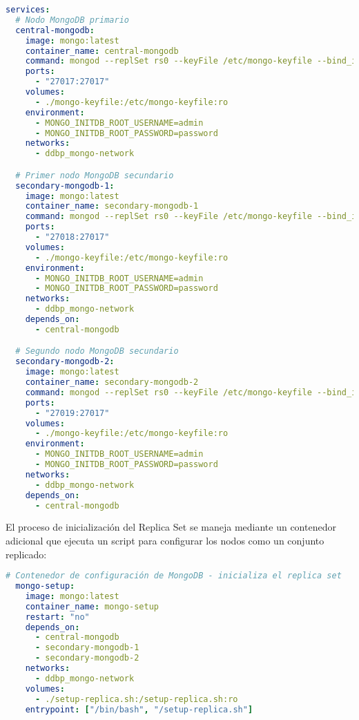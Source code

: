 \documentclass[12pt,letterpaper]{article}
\begin{document}
\begin{lstlisting}[language=yaml]
services:
  # Nodo MongoDB primario
  central-mongodb:
    image: mongo:latest
    container_name: central-mongodb
    command: mongod --replSet rs0 --keyFile /etc/mongo-keyfile --bind_ip_all --auth --port 27017
    ports:
      - "27017:27017"
    volumes:
      - ./mongo-keyfile:/etc/mongo-keyfile:ro
    environment:
      - MONGO_INITDB_ROOT_USERNAME=admin
      - MONGO_INITDB_ROOT_PASSWORD=password
    networks:
      - ddbp_mongo-network

  # Primer nodo MongoDB secundario
  secondary-mongodb-1:
    image: mongo:latest
    container_name: secondary-mongodb-1
    command: mongod --replSet rs0 --keyFile /etc/mongo-keyfile --bind_ip_all --auth --port 27017
    ports:
      - "27018:27017"
    volumes:
      - ./mongo-keyfile:/etc/mongo-keyfile:ro
    environment:
      - MONGO_INITDB_ROOT_USERNAME=admin
      - MONGO_INITDB_ROOT_PASSWORD=password
    networks:
      - ddbp_mongo-network
    depends_on:
      - central-mongodb

  # Segundo nodo MongoDB secundario
  secondary-mongodb-2:
    image: mongo:latest
    container_name: secondary-mongodb-2
    command: mongod --replSet rs0 --keyFile /etc/mongo-keyfile --bind_ip_all --auth --port 27017
    ports:
      - "27019:27017"
    volumes:
      - ./mongo-keyfile:/etc/mongo-keyfile:ro
    environment:
      - MONGO_INITDB_ROOT_USERNAME=admin
      - MONGO_INITDB_ROOT_PASSWORD=password
    networks:
      - ddbp_mongo-network
    depends_on:
      - central-mongodb
\end{lstlisting}

El proceso de inicialización del Replica Set se maneja mediante un contenedor adicional que ejecuta un script para configurar los nodos como un conjunto replicado:

\begin{lstlisting}[language=yaml]
  # Contenedor de configuración de MongoDB - inicializa el replica set
  mongo-setup:
    image: mongo:latest
    container_name: mongo-setup
    restart: "no"
    depends_on:
      - central-mongodb
      - secondary-mongodb-1
      - secondary-mongodb-2
    networks:
      - ddbp_mongo-network
    volumes:
      - ./setup-replica.sh:/setup-replica.sh:ro
    entrypoint: ["/bin/bash", "/setup-replica.sh"]
\end{lstlisting}
\end{document}
